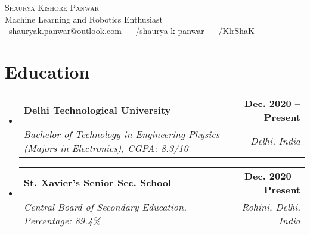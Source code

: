\documentclass[letterpaper,11pt]{article}
\makeatletter
\newcommand{\resumeSubheading}[4]{
  \vspace{-2pt}\item
    \begin{tabular*}{1.0\textwidth}[t]{l@{\extracolsep{\fill}}r}
      \textbf{#1} & \textbf{\small #2} \\
      \textit{\small#3} & \textit{\small #4} \\
    \end{tabular*}\vspace{-7pt}
}
\newcommand{\resumeSubHeadingListStart}{\begin{itemize}[leftmargin=0.0in, label={}]}
\newcommand{\resumeSubHeadingListEnd}{\end{itemize}}
\makeatother
\begin{document}

\begin{center}
    {\Huge \scshape Shaurya Kishore Panwar} \\ \vspace{2pt}
    Machine Learning and Robotics Enthusiast \\ \vspace{3pt}
    \href{mailto:shauryak.panwar@outlook.com}{\raisebox{-0.2\height}\faEnvelope\  \underline{shauryak.panwar@outlook.com}} ~ 
    \href{https://linkedin.com/in/shaurya-k-panwar/}{\raisebox{-0.2\height}\faLinkedin\ \underline{/shaurya-k-panwar}}  ~
    \href{https://github.com/KlrShaK}{\raisebox{-0.2\height}\faGithub\ \underline{/KlrShaK}}
    \vspace{-8pt}
\end{center}


\section{Education}
  \resumeSubHeadingListStart
    \resumeSubheading
      {Delhi Technological University}{Dec. 2020 -- Present}
      {Bachelor of Technology in Engineering Physics (Majors in Electronics), CGPA: 8.3/10}{Delhi, India}
    \resumeSubheading
      {St. Xavier's Senior Sec. School}{Dec. 2020 -- Present}
      {Central Board of Secondary Education, Percentage: 89.4\%}{Rohini, Delhi, India}
  \resumeSubHeadingListEnd

\end{document}
